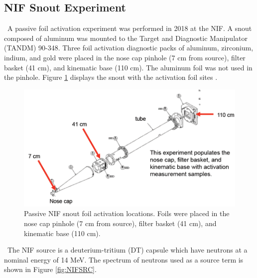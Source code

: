 \documentclass[journal]{IEEEtran}
\let\MYoriglatexcaption\caption
\renewcommand{\caption}[2][\relax]{\MYoriglatexcaption[#2]{#2}}
\begin{document}
	
	\subsection{NIF Snout Experiment}
	
	\ A passive foil activation experiment was performed in 2018 at the NIF. 
A snout composed of aluminum was mounted to the Target and Diagnostic Manipulator (TANDM) 90-348. 
Three foil activation diagnostic packs of aluminum, zirconium, indium, and gold were placed in the nose cap pinhole (7 cm from source), filter basket (41 cm), and kinematic base (110 cm). 
The aluminum foil was not used in the pinhole. 
Figure \ref{fig:NIF} displays the snout with the activation foil sites \cite{Bogetic}. 
	
	\begin{figure}[h!]
		\includegraphics[width=\linewidth]{Figures/NIF.png}
		\caption{Passive NIF snout foil activation locations.  Foils were placed in the nose cap pinhole (7 cm from source), filter basket (41 cm), and kinematic base (110 cm).}
		\label{fig:NIF}
	\end{figure}
	
	\ The NIF source is a deuterium-tritium (DT) capsule which have neutrons at a nominal energy of 14 MeV. 
The spectrum of neutrons used as a source term %
is shown in Figure \ref{fig:NIFSRC}. 
	
\end{document}
